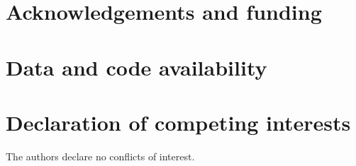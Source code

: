 \documentclass[preprint,12pt,authoryear]{elsarticle}
\begin{document}
\begin{frontmatter}
\title{\PaperTitle}

\end{frontmatter}

\section*{Acknowledgements and funding}


\section*{Data and code availability}


\section*{Declaration of competing interests}
The authors declare no conflicts of interest.

\AuthorContributions
\end{document}
